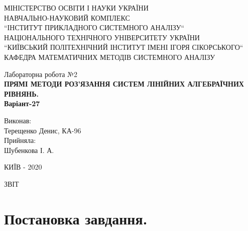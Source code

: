 \documentclass[14pt,a4paper]{scrartcl}
\theoremstyle{definition}
\newtheorem{defo}{Означення}[section]
\theoremstyle{remark}
\theoremstyle{definition}
\theoremstyle{definition}
\begin{document}
\def\be{\begin{equation}}
\def\ee{\end{equation}}

\def\bd{\begin{defo}}
\def\ed{\end{defo}}

\def\bbt{\begin{boxteo}}
\def\ebt{\end{boxteo}}

\begin{titlepage}
\centering
	\vspace{1cm}
	{ МІНІСТЕРСТВО ОСВІТИ І НАУКИ УКРАЇНИ\\
  НАВЧАЛЬНО-НАУКОВИЙ КОМПЛЕКС\\
  ``ІНСТИТУТ ПРИКЛАДНОГО СИСТЕМНОГО АНАЛІЗУ``\\
  НАЦІОНАЛЬНОГО ТЕХНІЧНОГО УНІВЕРСИТЕТУ УКРАЇНИ\\
  ``КИЇВСЬКИЙ ПОЛІТЕХНІЧНИЙ ІНСТИТУТ ІМЕНІ ІГОРЯ СІКОРСЬКОГО``\\
  КАФЕДРА МАТЕМАТИЧНИХ МЕТОДІВ  СИСТЕМНОГО АНАЛІЗУ\\\par}
	\vspace{5cm}
	{\large Лабораторна робота №2 \\
\textbf{ПРЯМІ МЕТОДИ РОЗ'ЯЗАННЯ СИСТЕМ ЛІНІЙНИХ АЛГЕБРАЇЧНИХ РІВНЯНЬ.\\ Варіант-27} \\ \par}
	\vfill
  \begin{flushright}
  Виконав:\\
   Терещенко Денис, КА-96\\
   Прийняла:\\
   Шубенкова І. А.\\
  \end{flushright}


	\vfill

	{\large КИЇВ - 2020 \par}
\end{titlepage}


\begin{center}

ЗВІТ


\end{center}

\section{Постановка завдання.}
\end{document}
